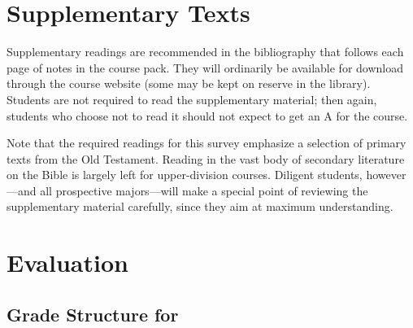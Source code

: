 \documentclass[titlepage]{article}
\begin{document}
\section{Supplementary Texts}
\label{supplementary}

Supplementary readings are recommended in the bibliography that follows
each page of notes in the course pack. They will ordinarily be available
for download through the course website (some may be kept on reserve
in the library). Students are not required to read the supplementary
material; then again, students who choose not to read it should not
expect to get an A for the course.

Note that the required readings for this survey emphasize a selection
of primary texts from the Old Testament. Reading in the vast body of
secondary literature on the Bible is largely left for upper-division
courses. Diligent students, however---and all prospective majors---will
make a special point of reviewing the supplementary material carefully,
since they aim at maximum understanding.

\section{Evaluation}
\label{evaluation}

\subsection{Grade Structure for \ccode}
\label{structure}

\end{document}
